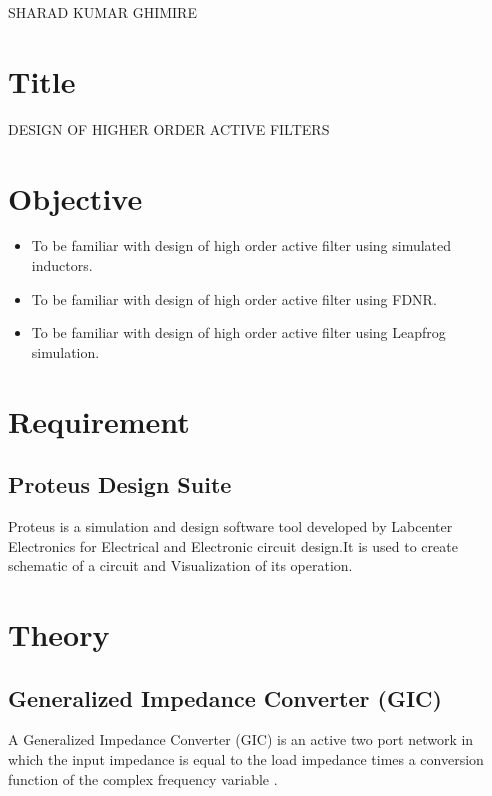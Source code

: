 \documentclass[a4paper,11pt]{article}
\begin{document}
{SHARAD KUMAR GHIMIRE}

\renewcommand{\contentsname}{Table of Contents}
\tableofcontents

\pagebreak
\listoffigures
\vspace{5em}
\listoftables


\pagebreak
{}

\section{Title} {\large DESIGN OF HIGHER ORDER ACTIVE FILTERS}


\section{Objective}
\begin{itemize}
    \item To be familiar with design of high order active filter using simulated inductors.
    \item To be familiar with design of high order active filter using FDNR.
    \item To be familiar with design of high order active filter using Leapfrog simulation.
\end{itemize}

\section{Requirement}

\subsection{Proteus Design Suite}

Proteus is a simulation and design software tool developed by Labcenter Electronics for Electrical
and Electronic circuit design.It is used to create schematic  of a circuit and
Visualization of its operation.

\pagebreak
\section{Theory}
\subsection{Generalized Impedance Converter (GIC)}
A Generalized Impedance Converter (GIC) is an active two port network in which the input impedance is equal to the load impedance times a conversion function of the complex frequency variable .
\end{document}
